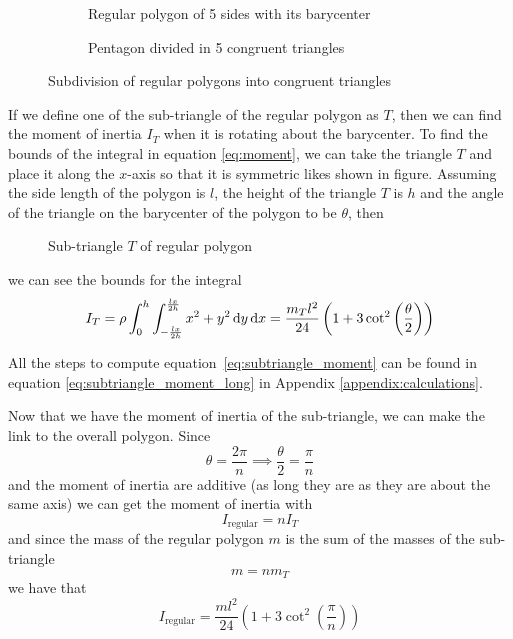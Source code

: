 \begin{figure}[H]
	\centering
	\hfill
	\begin{subfigure}[]{.45\textwidth}
		\centering
		\caption{Regular polygon of 5 sides with its barycenter}
		\label{fig:pentagon}
	\end{subfigure}
	\hfill
	\begin{subfigure}[]{.45\textwidth}
		\centering
		\caption{Pentagon divided in 5 congruent triangles}
		\label{fig:pentagon_triangles}
	\end{subfigure}
	\hfill\null
	\caption{Subdivision of regular polygons into congruent triangles}
	\label{fig:regular_poly}
\end{figure}

If we define one of the sub-triangle of the regular polygon as $T$, then we can
find the moment of inertia $I_T$ when it is rotating about the barycenter. To
find the bounds of the integral in equation \ref{eq:moment}, we can take the
triangle $T$ and place it along the $x$-axis so that it is symmetric likes shown
in figure. Assuming the side length of the polygon is $l$, the height of the
triangle $T$ is $h$ and the angle of the triangle on the barycenter of the
polygon to be $\theta$, then
\begin{figure}[H]
	\centering
	\caption{Sub-triangle $T$ of regular polygon}
	\label{fig:subtriangle}
\end{figure}
we can see the bounds for the integral
\begin{equation}
	\label{eq:subtriangle_moment}
	I_{T} = \rho \int_0^h\int_{-\frac{lx}{2h}}^{\frac{lx}{2h}}x^2 + y^2 \mathop{}\!\mathrm{d}
	y\mathop{}\!\mathrm{d} x= \frac{m_Tl^2}{24} \left(1 + 3\cot^2\left(\frac{\theta}{2}\right)\right)
\end{equation}

All the steps to compute equation~\ref{eq:subtriangle_moment} can be found in
equation \ref{eq:subtriangle_moment_long} in Appendix
\ref{appendix:calculations}.

Now that we have the moment of inertia of the sub-triangle, we can make the link
to the overall polygon. Since
$$ \theta = \frac{2\pi}{n} \implies \frac{\theta}{2} = \frac{\pi}{n} $$
and the moment of inertia are additive (as long they are as they are about the same
axis) we can get the moment of inertia with
$$ I_{\text{regular}} = n I_T $$
and since the mass of the regular polygon $m$ is the sum of the masses of the
sub-triangle
$$ m = n m_T $$
we have that
\begin{equation}
	\label{eq:regular_moment}
	I_{\text{regular}} = \frac{ml^2}{24} \left( 1 + 3\cot^2\left(\frac{\pi}{n}\right) \right)
\end{equation}




